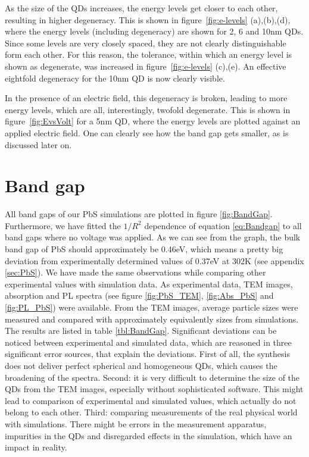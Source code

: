 As the size of the QDs increases, the energy levels get closer to each other, resulting in higher degeneracy. This is shown in figure~\ref{fig:e-levels} (a),(b),(d), where the energy levels (including degeneracy) are shown for 2, 6 and 10nm QDs. Since some levels are very closely spaced, they are not clearly distinguishable form each other. For this reason, the tolerance, within which an energy level is shown as degenerate, was increased in figure~\ref{fig:e-levels} (c),(e). An effective eightfold degeneracy for the 10nm QD is now clearly visible.
	
In the presence of an electric field, this degeneracy is broken, leading to more energy levels, which are all, interestingly, twofold degenerate. This is shown in figure~\ref{fig:EvsVolt} for a 5nm QD, where the energy levels are plotted against an applied electric field. One can clearly see how the band gap gets smaller, as is discussed later on.
\FloatBarrier

\section{Band gap} \label{sec:BandGapAnalysis}
	All band gaps of our PbS simulations are plotted in figure \ref{fig:BandGap}. Furthermore, we have fitted the $1/R^2$ dependence of
	equation \ref{eq:Bandgap} to all band gaps where no voltage was applied.
	As we can see from the graph, the bulk band gap of \gls{PbS} should approximately be 0.46eV, which means a pretty big deviation
	from experimentally determined values of 0.37eV at 302K (see appendix \ref{sec:PbS}). We have made the same observations while comparing
	other experimental values with simulation data. As experimental data, \gls{TEM} images, absorption and \gls{PL} spectra (see figure \ref{fig:PbS_TEM},
	\ref{fig:Abs_PbS} and \ref{fig:PL_PbS}) were available. From the \gls{TEM} images, average particle sizes were measured and compared
	with approximately equivalently sizes from simulations. The results are listed in table \ref{tbl:BandGap}. Significant deviations
	can be noticed between experimental and simulated data, which are reasoned in three significant error sources, that explain the deviations.
	First of all, the synthesis does not deliver perfect spherical and homogeneous \glspl{QD}, which causes the broadening of the spectra.
	Second: it is very difficult to determine the size of the \glspl{QD} from the \gls{TEM} images, especially without
	sophisticated software. This might lead to comparison of experimental and simulated values, which actually do not belong to each other.
	Third: comparing measurements of the real physical world with simulations. There might be errors in the measurement
	apparatus, impurities in the \glspl{QD} and disregarded effects in the simulation, which have an impact in reality.
	

